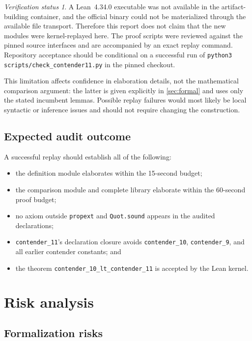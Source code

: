 \documentclass[11pt]{article}
\theoremstyle{definition}
\theoremstyle{remark}
\newtheorem{status}[theorem]{Verification status}
\newcommand{\code}[1]{\texttt{#1}}
\begin{document}
\begin{status}
A Lean~4.34.0 executable was not available in the artifact-building container,
and the official binary could not be materialized through the available file
transport. Therefore this report does not claim that the new modules were
kernel-replayed here. The proof scripts were reviewed against the pinned source
interfaces and are accompanied by an exact replay command. Repository
acceptance should be conditional on a successful run of
\code{python3 scripts/check\_contender11.py} in the pinned checkout.
\end{status}

This limitation affects confidence in elaboration details, not the mathematical
comparison argument: the latter is given explicitly in \cref{sec:formal} and
uses only the stated incumbent lemmas. Possible replay failures would most
likely be local syntactic or inference issues and should not require changing
the construction.

\subsection{Expected audit outcome}

A successful replay should establish all of the following:

\begin{itemize}[leftmargin=*]
\item the definition module elaborates within the 15-second budget;
\item the comparison module and complete library elaborate within the
  60-second proof budget;
\item no axiom outside \code{propext} and \code{Quot.sound} appears in the
  audited declarations;
\item \code{contender\_11}'s declaration closure avoids
  \code{contender\_10}, \code{contender\_9}, and all earlier contender
  constants; and
\item the theorem \code{contender\_10\_lt\_contender\_11} is accepted by the
  Lean kernel.
\end{itemize}

\section{Risk analysis}

\subsection{Formalization risks}
\end{document}
